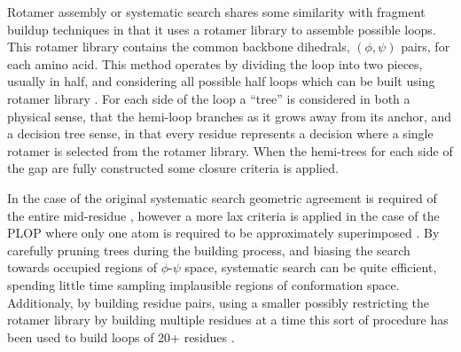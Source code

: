 Rotamer assembly or systematic search shares some similarity with fragment buildup techniques in that it uses a rotamer library to assemble possible loops.
This rotamer library contains the common backbone dihedrals, $(\phi,\psi)$ pairs, for each amino acid.
This method operates by dividing the loop into two pieces, usually in half, and considering all possible half loops which can be built using rotamer library \cite{moult1986algorithm}.
For each side of the loop a ``tree'' is considered in both a physical sense, that the hemi-loop branches as it grows away from its anchor, and a decision tree sense, in that every residue represents a decision where a single rotamer is selected from the rotamer library.
When the hemi-trees for each side of the gap are fully constructed some closure criteria is applied.

In the case of the original systematic search geometric agreement is required of the entire mid-residue \cite{moult1986algorithm}, however a more lax criteria is applied in the case of the PLOP where only one atom is required to be approximately superimposed \cite{jacobson2004hierarchical}.
By carefully pruning trees during the building process, and biasing the search towards occupied regions of $\phi$-$\psi$ space, systematic search can be quite efficient, spending little time sampling implausible regions of conformation space.
Additionaly, by building residue pairs, using a smaller
 possibly restricting the rotamer library by building multiple residues at a time this sort of procedure has been used to build loops of 20+ residues \cite{zhao2011progress}.
